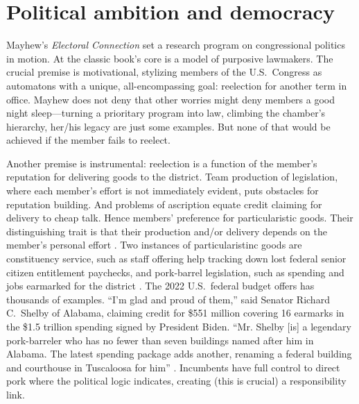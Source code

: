 \documentclass[letter,12pt]{article}
\begin{document}

\section{Political ambition and democracy}

Mayhew's \emph{Electoral Connection} \citeyearpar{mayhew.1974} set a research program on congressional politics in motion. At the classic book's core is a model of purposive lawmakers. The crucial premise is motivational, stylizing members of the U.S.\ Congress as automatons with a unique, all-encompassing goal: reelection for another term in office. Mayhew does not deny that other worries might deny members a good night sleep---turning a prioritary program into law, climbing the chamber's hierarchy, her/his legacy are just some examples. But none of that would be achieved if the member fails to reelect. %

Another premise is instrumental: reelection is a function of the member's reputation for delivering goods to the district. Team production of legislation, where each member's effort is not immediately evident, puts obstacles for reputation building. And problems of ascription equate credit claiming for delivery to cheap talk. Hence members' preference for particularistic goods. Their distinguishing trait is that their production and/or delivery depends on the member's personal effort \citep{haggard.mccubbins.2001}. Two instances of particularistinc goods are constituency service, such as staff offering help tracking down lost federal senior citizen entitlement paychecks, and pork-barrel legislation, such as spending and jobs earmarked for the district \citep{cain.etal.1987}. The 2022 U.S.\ federal budget offers has thousands of examples. ``I'm glad and proud of them,'' said Senator Richard C.\ Shelby of Alabama, claiming credit for \$551 million covering 16 earmarks in the \$1.5 trillion spending signed by President Biden. ``Mr. Shelby [is] a legendary pork-barreler who has no fewer than seven buildings named after him in Alabama. The latest spending package adds another, renaming a federal building and courthouse in Tuscaloosa for him'' \citep{nyt-pork.2022}. Incumbents have full control to direct pork where the political logic indicates, creating (this is crucial) a responsibility link.
\end{document}
